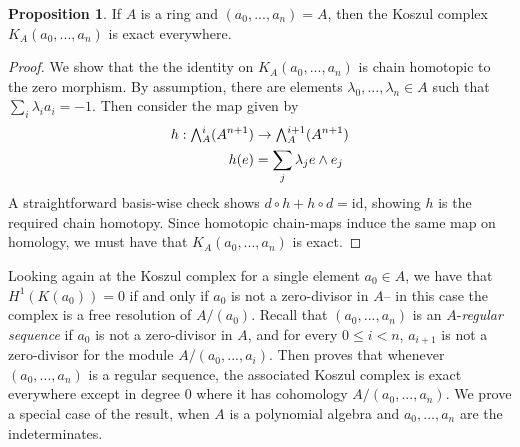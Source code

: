\documentclass[a4paper]{article}
\theoremstyle{definition}
\newtheorem{prop}[defn]{Proposition}
\theoremstyle{remark}
\newcommand{\Exter}{\mathchoice{{\textstyle\bigwedge}}%
    {{\bigwedge}}%
    {{\textstyle\wedge}}%
    {{\scriptstyle\wedge}}}
\begin{document}
\begin{prop}\label{koszul-unitideal}
    If \(A\) is a ring and \((a_0,...,a_n)=A\), then the
    Koszul complex \(K_A(a_0,...,a_n)\) is exact everywhere.
    \begin{proof}
        We show that the the identity on \(K_A(a_0,...,a_n)\) is chain
        homotopic to the zero morphism. By assumption, there are elements
        \(\lambda_0,...,\lambda_n\in A\) such that \(\sum_i \lambda_i a_i =-1\).
        Then consider the map given by
        \begin{align*}
            h: \Exter^i_A(A^{n+1})&\rightarrow \Exter^{i+1}_A(A^{n+1})\\
            h(e)&= \sum_j \lambda_j e\wedge e_j
        \end{align*}
        A straightforward basis-wise check shows \(d\circ h + h\circ d =
        \text{id}\), showing \(h\) is the required chain homotopy. Since
        homotopic chain-maps induce the same map on homology, we must have that
        \(K_A(a_0,...,a_n)\) is exact.
    \end{proof}
\end{prop}

Looking again at the Koszul complex for a single element \(a_0\in A\),
we have that \(H^1(K(a_0))=0\) if and only if \(a_0\) is not a
zero-divisor in \(A\)-- in this case the complex is a free resolution of
\(A/(a_0)\).  Recall that \((a_0,...,a_n)\) is an \(A\)-\textit{regular
sequence} if \(a_0\) is not a zero-divisor in \(A\), and for every \(0\leq i <
n\), \(a_{i+1}\) is not a zero-divisor for the module \(A/(a_0,...,a_i)\). Then
 proves that whenever \((a_0,...,a_n)\) is
a regular sequence, the associated Koszul complex is exact everywhere except in
degree \(0\) where it has cohomology \(A/(a_0,...,a_n)\). We prove a special
case of the result, when \(A\) is a polynomial algebra and \(a_0,...,a_n\) are
the indeterminates.
\end{document}
